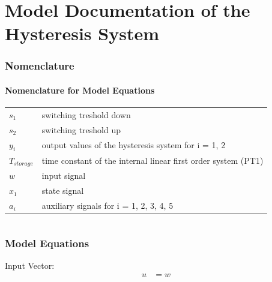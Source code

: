 \documentclass[10pt,a4paper]{article}
\begin{document}
	\part*{Model Documentation of the \\ Hysteresis System} %
	
	
	\section{Nomenclature} %
	\subsection{Nomenclature for Model Equations} %
	
	\begin{tabular}{ll}
		$s_1$ & switching treshold down \\
		$s_2$ & switching treshold up \\
		$y_i$ & output values of the hysteresis system for i = 1, 2 \\
		$T_{storage}$ & time constant of the internal linear first order system (PT1) \\
		$w$ & input signal \\
		$x_1$ & state signal\\
		$a_i$ & auxiliary signals for i = 1, 2, 3, 4, 5 \\			
	\end{tabular}
	 
	
	\begin{tabular}{ll}

	\end{tabular}
	
	
	\section{Model Equations} %
	
	Input Vector:
	\begin{align*}
		u &= w
	\end{align*}
	
\end{document}
